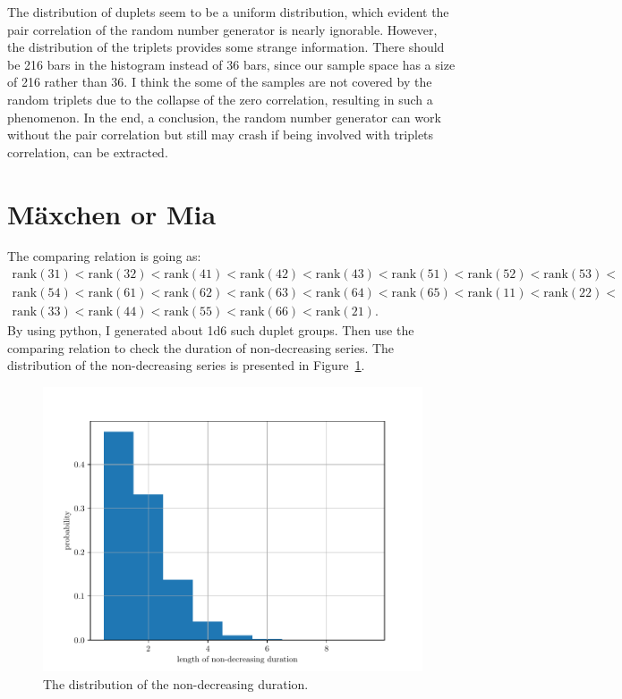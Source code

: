 \documentclass[paper=a4, fontsize=11pt]{scrartcl} %
\numberwithin{equation}{section} %
\numberwithin{figure}{section} %
\numberwithin{table}{section} %
\begin{document}
The distribution of duplets seem to be a uniform distribution, which evident the pair correlation of the random number generator is nearly ignorable. However, the distribution of the triplets provides some strange information. There should be 216 bars in the histogram instead of 36 bars, since our sample space has a size of 216 rather than 36. I think the some of the samples are not covered by the random triplets due to the collapse of the zero correlation, resulting in such a phenomenon. In the end, a conclusion, the random number generator can work without the pair correlation but still may crash if being involved with triplets correlation, can be extracted. \par


\section{M{\"a}xchen or Mia}

The comparing relation is going as:
\begin{gather*}
	\text{rank}(31) < \text{rank}(32) < \text{rank}(41) < \text{rank}(42) < \text{rank}(43) < \text{rank}(51) < \text{rank}(52) < \text{rank}(53) < \\\text{rank}(54) < \text{rank}(61) < \text{rank}(62) < \text{rank}(63) < \text{rank}(64) < \text{rank}(65) < \text{rank}(11) < \text{rank}(22) < \\\text{rank}(33) < \text{rank}(44) < \text{rank}(55) < \text{rank}(66) < \text{rank}(21).
\end{gather*}
By using python, I generated about \num{1d6} such duplet groups. Then use the comparing relation to check the duration of non-decreasing series. The distribution of the non-decreasing series is presented in Figure~\ref{fig:maexchen_1}. \par
\begin{figure}[!ht]
	\centering
	\includegraphics[width=0.495\linewidth]{figure_2.pdf}
	\caption{The distribution of the non-decreasing duration.}
	\label{fig:maexchen_1}
\end{figure}
\end{document}
